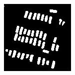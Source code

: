 \documentclass[a4paper,11pt]{article}
\begin{document}
\begin{figure}[H]
\endminipage\hfill
{}%
  \includegraphics[width=\linewidth]{class_vs_w/weight_1}
\endminipage
\caption{}
\end{figure}
\end{document}
